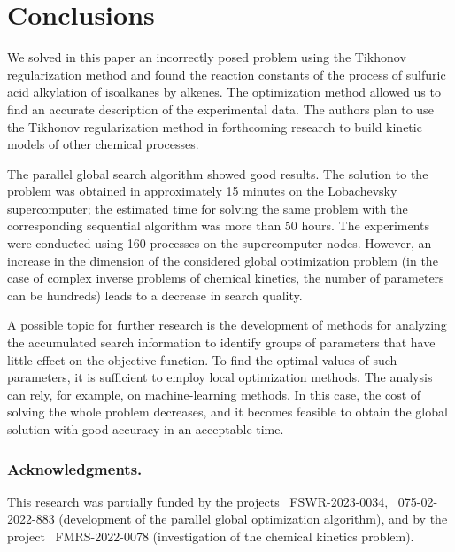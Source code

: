 \documentclass{svproc}
\begin{document}
\section{Conclusions}

We solved in this paper an incorrectly posed problem using the Tikhonov regularization method and found the reaction constants of the process of sulfuric acid alkylation of isoalkanes by alkenes. The optimization method allowed us to find an accurate description of the experimental data. The authors plan to use the Tikhonov regularization method in forthcoming research to build kinetic models of other chemical processes.

The parallel global search algorithm showed good results. The solution to the problem was obtained in approximately 15 minutes on the Lobachevsky supercomputer; the estimated time for solving the same problem with the corresponding sequential algorithm was more than 50 hours. The experiments were conducted using 160 processes on the supercomputer nodes. However, an increase in the dimension of the considered global optimization problem (in the case of complex inverse problems of chemical kinetics, the number of parameters can be hundreds) leads to a decrease in search quality.

A possible topic for further research is the development of methods for analyzing the accumulated search information to identify groups of parameters that have little effect on the objective function. To find the optimal values of such parameters, it is sufficient to employ local optimization methods. The analysis can rely, for example, on machine-learning methods. In this case, the cost of solving the whole problem decreases, and it becomes feasible to obtain the global solution with good accuracy in an acceptable time.

\subsubsection*{Acknowledgments.}


This research was partially funded by the projects \textnumero~FSWR-2023-0034, \textnumero~075-02-2022-883 (development of the parallel global optimization algorithm), and by the project \textnumero~FMRS-2022-0078 (investigation of the chemical kinetics problem).


%
%

{}
\end{document}

